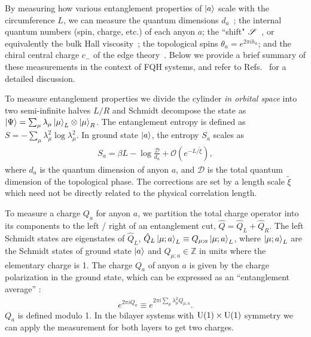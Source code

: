 By measuring how various entanglement properties of $\ket{a}$ scale with the circumference $L$, we can measure 
	the quantum dimensions $d_a$~\cite{KitaevPreskill,LevinWen};
	the internal quantum numbers (spin, charge, etc.) of each anyon $a$;
	the ``shift" $\mathscr{S}$~\cite{wenzee}, or equivalently the bulk Hall viscosity~\cite{ZaletelQHdmrg13};
	the topological spins $\theta_a = e^{2 \pi i h_a}$; and the chiral central charge $c_-$ of the edge theory~\cite{Zhang2012, ZaletelQHdmrg13, HHTuMomPol13}.
Below we provide a brief summary of these measurements in the context of FQH systems, and refer to Refs.~\cite{ZaletelMixing} for a detailed discussion. 

To measure entanglement properties we divide the cylinder \emph{in orbital space} into two semi-infinite halves $L/R$ and Schmidt decompose the state as $ \ket{\Psi} = \sum_\mu \lambda_\mu \ket{\mu}_{ L} \otimes \ket{\mu}_{ R}$.
The entanglement entropy is defined as $S= - \sum_\mu \lambda_\mu^2 \log \lambda_\mu^2$.
In ground state $\ket{a}$, the entropy $S_a$ scales as \cite{KitaevPreskill,LevinWen} 
\begin{align}
	S_a = \beta L - \log\frac{\mathcal{D}}{d_a} + \mathcal{O}(e^{-L / \tilde{\xi}}),
	\label{eq:TEE}
\end{align}
where $d_a$ is the quantum dimension of anyon $a$, and $\mathcal{D}$ is the total quantum dimension of the topological phase.
The corrections are set by a length scale $\tilde{\xi}$ which need not be directly related to the physical correlation length.

To measure a \Uone charge $Q_a$ for anyon $a$, we partition the total charge operator into its components to the left / right of an entanglement cut, $\hat{Q} = \hat{Q}_L + \hat{Q}_R$. 
The left Schmidt states are eigenstates of $\hat{Q}_L$, $\hat{Q}_L \ket{\mu; a}_L \equiv Q_{\mu; a} \ket{\mu; a}_L $, where $\ket{\mu; a}_L$ are the Schmidt states of ground state $\ket{a}$ and $Q_{\mu; a} \in \mathbb{Z}$ in units where the elementary charge is 1.
The charge $Q_a$ of anyon $a$ is given by the charge polarization in the ground state, which can be expressed as an ``entanglement average'' \cite{ZaletelQHdmrg13}:
\begin{align}
	e^{2 \pi i Q_a} \equiv e^{2 \pi i \sum_\mu \lambda^2_\mu Q_{\mu; a}}.
\end{align}
$Q_a$ is defined modulo 1.
In the bilayer systems with $\mathrm{U(1)}\times\mathrm{U(1)}$ symmetry we can apply the measurement for both layers to get two charges.

